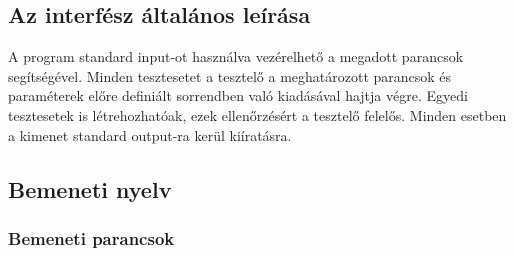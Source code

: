 \documentclass[../../projlab]{subfiles}
\begin{document}
\subsection{Az interfész általános leírása}
A program standard input-ot használva vezérelhető a megadott parancsok segítségével. Minden tesztesetet a tesztelő a meghatározott parancsok és paraméterek előre definiált sorrendben való kiadásával hajtja végre. Egyedi tesztesetek is létrehozhatóak, ezek ellenőrzésért a tesztelő felelős.
Minden esetben a kimenet standard output-ra kerül kiíratásra.
\subsection{Bemeneti nyelv}

\subsubsection{Bemeneti parancsok}
\end{document}

